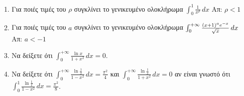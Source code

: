 \begin{enumerate}
	\item Για ποιές τιμές του $\rho$ συγκλίνει το γενικευμένο ολοκλήρωμα 
		\(
		\int _{0}^{1} \frac{1}{x^{\rho}} \,{dx} 
		\) \hfill Απ: $ \rho < 1 $

	\item Για ποιές τιμές του $a$ συγκλίνει το γενικευμένο ολοκλήρωμα
		\(
		\int _{0}^{+\infty} \frac{(x+1)^{a} e^{-x}}{\sqrt{x}} \,{dx} \hfill
		\) \hfill Απ: $ a<-1 $

	\item Να δείξετε ότι $ \int _{0}^{+\infty} \frac{\ln{x}}{1+x^{2}} \, dx = 0
		$.

	\item Να δείξετε ότι $ \int _{0}^{+\infty} \frac{\ln{\frac{1}{x}}}{1-x^{2}}
		\,{dx} = \frac{\pi ^{2}}{4} $ και $ \int _{0}^{+\infty}
		\frac{\ln{\frac{1}{x}}}{1+x^{2}} \,{dx} = 0 $ αν είναι γνωστό ότι $
		\int _{0}^{1} \frac{\ln{\frac{1}{x}}}{1-x^{2}} \,{dx} =
		\frac{\pi ^{2}}{8} $.

\end{enumerate}


